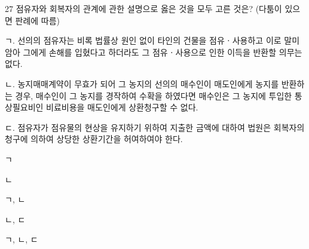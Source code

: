 \begin{question}{27}
점유자와 회복자의 관계에 관한 설명으로 옳은 것을 모두 고른 것은? (다툼이 있으면 판례에 따름)
\begin{framedtext}
ㄱ. 선의의 점유자는 비록 법률상 원인 없이 타인의 건물을 점유ㆍ사용하고 이로 말미암아 그에게 손해를 입혔다고 하더라도 그 점유ㆍ사용으로 인한 이득을 반환할 의무는 없다. \par
ㄴ. 농지매매계약이 무효가 되어 그 농지의 선의의 매수인이 매도인에게 농지를 반환하는 경우, 매수인이 그 농지를 경작하여 수확을 하였다면 매수인은 그 농지에 투입한 통상필요비인 비료비용을 매도인에게 상환청구할 수 없다. \par
ㄷ. 점유자가 점유물의 현상을 유지하기 위하여 지출한 금액에 대하여 법원은 회복자의 청구에 의하여 상당한 상환기간을 허여하여야 한다. \par
\end{framedtext}
\begin{choices}
  \item ㄱ
  \item ㄴ
  \item ㄱ, ㄴ
  \item ㄴ, ㄷ
  \item ㄱ, ㄴ, ㄷ
\end{choices}
\end{question}
